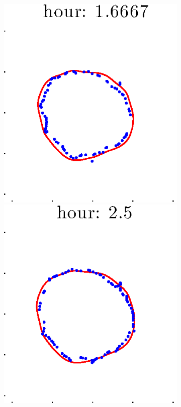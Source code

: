 \documentclass[12pt]{article}
\begin{document}
\begin{figure}[h!]
\begin{subfigure}[b]{.3\textwidth}
		\includegraphics[height=.15\textheight]{Pos5exp2/secondhalf/full3.eps}
		\includegraphics[height=.15\textheight]{Pos5exp2/secondhalf/full4.eps}

\end{subfigure}
\end{figure}
\end{document}
